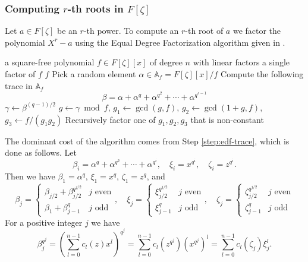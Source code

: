 \documentclass[12pt]{article}
\theoremstyle{plain}
\theoremstyle{definition}
\newcounter{algorithm}
\begin{document}

\subsubsection{Computing $r$-th roots in $F[\zeta]$}
\label{subsection:rth-root-fpz}

Let $a \in F[\zeta]$ be an $r$-th power. To compute an $r$-th root of $a$ we factor the 
polynomial $X^r - a$ using the Equal Degree Factorization algorithm given in 
\cite{kaltofen+shoup97}.
\begin{algorithm}
	\label{algorithm:edf}
	\begin{algorithmic}[1]
		\REQUIRE a square-free polynomial $f \in F[\zeta][x]$ of degree $n$ with linear factors
		\ENSURE a single factor of $f$
		\RETURN $f$
		\ENDIF
		\STATE Pick a random element $\alpha \in \mathbb{A}_f = F[\zeta][x]/f$
		\STATE\label{step:edf-trace} Compute the following trace in $\mathbb{A}_f$
		\[ \beta = \alpha + \alpha^q + \alpha^{q^2} + \cdots + \alpha^{q^{s - 1}} \]
		\STATE $\gamma \leftarrow \beta^{(q - 1) / 2}$
		\STATE $g \leftarrow \gamma \bmod f$, $g_1 \leftarrow \gcd(g, f)$, $g_2 \leftarrow \gcd(1 + 
		g, f)$, $g_3 \leftarrow f/(g_1g_2)$
		\STATE Recursively factor one of $g_1, g_2, g_3$ that is non-constant
	\end{algorithmic}
\end{algorithm}
The dominant cost of the algorithm comes from Step \ref{step:edf-trace}, which is done as follows. 
Let
\[ \beta_i = \alpha^q + \alpha^{q^2} + \cdots + \alpha^{q^i}, \quad \xi_i = x^{q^i}, \quad \zeta_i 
= z^{q^i}. \]
Then we have $\beta_1 = \alpha^q$, $\xi_1 = x^q$, $\zeta_1 = z^q$, and
\[
\beta_j = 
\begin{cases}
	\beta_{j / 2} + \beta_{j / 2}^{q^{j / 2}} & j \text{ even} \\
	\beta_1 + \beta_{j - 1}^q & j \text{ odd}
\end{cases}, \quad
\xi_j = 
\begin{cases}
	\xi_{j / 2}^{q^{j / 2}} & j \text{ even} \\
	\xi_{j - 1}^q & j \text{ odd}
\end{cases}, \quad
\zeta_j = 
\begin{cases}
	\zeta_{j / 2}^{q^{j / 2}} & j \text{ even} \\
	\zeta_{j - 1}^q & j \text{ odd}
\end{cases}
\]
For a positive integer $j$ we have
\begin{equation}
	\label{equation:betaj}
	\beta_j^{q^j} = \left( \sum_{l = 0}^{n - 1}c_l(z)x^l \right)^{q^j} = \sum_{l = 0}^{n - 
	1}c_l(z^{q^j})(x^{q^j})^l = \sum_{l = 0}^{n - 1}c_l(\zeta_j)\xi_j^l.
\end{equation}
\end{document}
